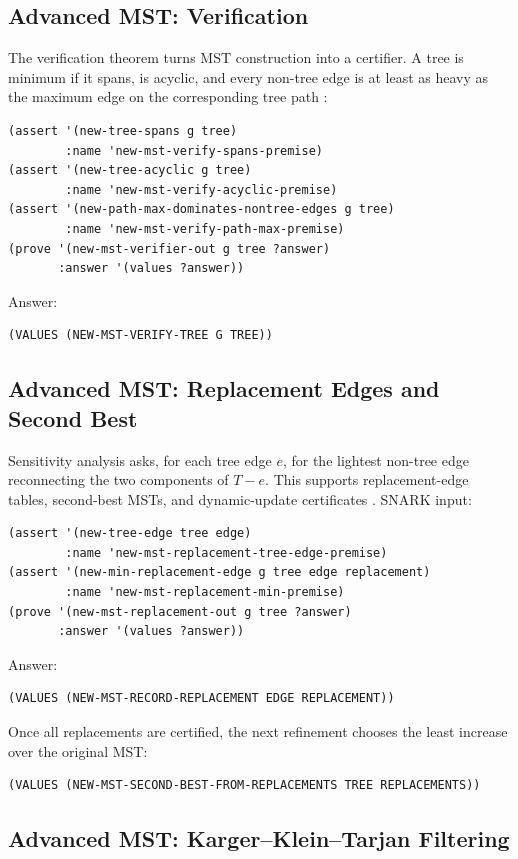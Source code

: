 \documentclass[runningheads]{llncs}
\begin{document}
\subsection{Advanced MST: Verification}

The verification theorem turns MST construction into a certifier.  A tree is
minimum if it spans, is acyclic, and every non-tree edge is at least as heavy
as the maximum edge on the corresponding tree path
\cite{DixonRauchTarjan1992}:
\begin{lstlisting}
(assert '(new-tree-spans g tree)
        :name 'new-mst-verify-spans-premise)
(assert '(new-tree-acyclic g tree)
        :name 'new-mst-verify-acyclic-premise)
(assert '(new-path-max-dominates-nontree-edges g tree)
        :name 'new-mst-verify-path-max-premise)
(prove '(new-mst-verifier-out g tree ?answer)
       :answer '(values ?answer))
\end{lstlisting}
Answer:
\begin{lstlisting}
(VALUES (NEW-MST-VERIFY-TREE G TREE))
\end{lstlisting}

\subsection{Advanced MST: Replacement Edges and Second Best}

Sensitivity analysis asks, for each tree edge \(e\), for the lightest
non-tree edge reconnecting the two components of \(T-e\).  This supports
replacement-edge tables, second-best MSTs, and dynamic-update certificates
\cite{DixonRauchTarjan1992,Eppstein1994}.
SNARK input:
\begin{lstlisting}
(assert '(new-tree-edge tree edge)
        :name 'new-mst-replacement-tree-edge-premise)
(assert '(new-min-replacement-edge g tree edge replacement)
        :name 'new-mst-replacement-min-premise)
(prove '(new-mst-replacement-out g tree ?answer)
       :answer '(values ?answer))
\end{lstlisting}
Answer:
\begin{lstlisting}
(VALUES (NEW-MST-RECORD-REPLACEMENT EDGE REPLACEMENT))
\end{lstlisting}
Once all replacements are certified, the next refinement chooses the least
increase over the original MST:
\begin{lstlisting}
(VALUES (NEW-MST-SECOND-BEST-FROM-REPLACEMENTS TREE REPLACEMENTS))
\end{lstlisting}

\subsection{Advanced MST: Karger--Klein--Tarjan Filtering}
\end{document}
